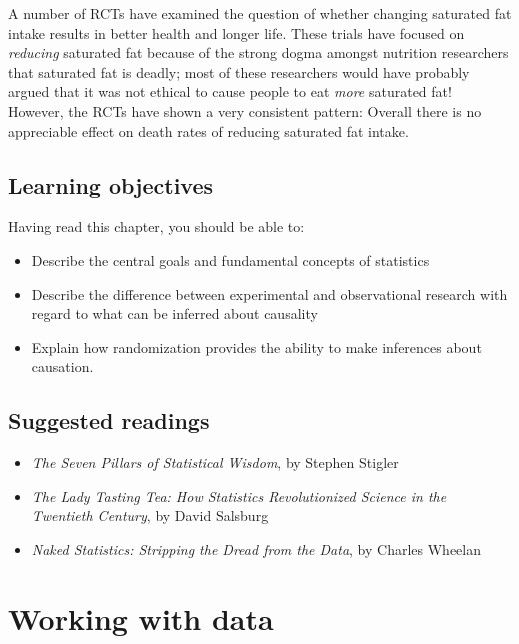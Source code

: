 \documentclass[
  12pt,
]{book}
\providecommand{\tightlist}{%
  \setlength{\itemsep}{0pt}\setlength{\parskip}{0pt}}
\begin{document}
A number of RCTs have examined the question of whether changing saturated fat intake results in better health and longer life. These trials have focused on \emph{reducing} saturated fat because of the strong dogma amongst nutrition researchers that saturated fat is deadly; most of these researchers would have probably argued that it was not ethical to cause people to eat \emph{more} saturated fat! However, the RCTs have shown a very consistent pattern: Overall there is no appreciable effect on death rates of reducing saturated fat intake.

\hypertarget{learning-objectives}{%
\section{Learning objectives}\label{learning-objectives}}

Having read this chapter, you should be able to:

\begin{itemize}
\tightlist
\item
  Describe the central goals and fundamental concepts of statistics
\item
  Describe the difference between experimental and observational research with regard to what can be inferred about causality
\item
  Explain how randomization provides the ability to make inferences about causation.
\end{itemize}

\hypertarget{suggested-readings}{%
\section{Suggested readings}\label{suggested-readings}}

\begin{itemize}
\tightlist
\item
  \emph{The Seven Pillars of Statistical Wisdom}, by Stephen Stigler
\item
  \emph{The Lady Tasting Tea: How Statistics Revolutionized Science in the Twentieth Century}, by David Salsburg
\item
  \emph{Naked Statistics: Stripping the Dread from the Data}, by Charles Wheelan
\end{itemize}

\hypertarget{working-with-data}{%
\chapter{Working with data}\label{working-with-data}}
\end{document}

